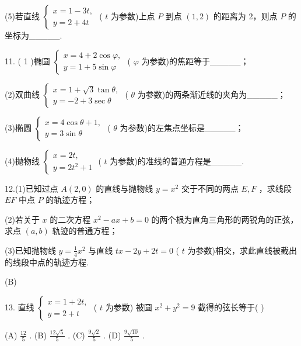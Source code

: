 \documentclass[10pt]{article}
\begin{document}
(5)若直线 \(\left\{  \begin{array}{l} x = 1 - {3t}, \\  y = 2 + {4t} \end{array}\right.\) ( \(t\) 为参数)上点 \(P\) 到点 \(\left( {1,2}\right)\) 的距离为 2，则点 \(P\) 的坐标为\_\_\_\_\_.

11. ( 1 )椭圆 \(\left\{  \begin{array}{l} x = 4 + 2\cos \varphi , \\  y = 1 + 5\sin \varphi  \end{array}\right.\) ( \(\varphi\) 为参数)的焦距等于\_\_\_\_\_；

(2)双曲线 \(\left\{  \begin{array}{l} x = 1 + \sqrt{3}\tan \theta , \\  y =  - 2 + 3\sec \theta  \end{array}\right.\) ( \(\theta\) 为参数)的两条渐近线的夹角为\_\_\_\_\_；

(3)椭圆 \(\left\{  \begin{array}{l} x = 4\cos \theta  + 1, \\  y = 3\sin \theta  \end{array}\right.\) ( \(\theta\) 为参数)的左焦点坐标是\_\_\_\_\_；

(4)抛物线 \(\left\{  \begin{array}{l} x = {2t}, \\  y = 2{t}^{2} + 1 \end{array}\right.\) ( \(t\) 为参数)的准线的普通方程是\_\_\_\_\_.

12.(1)已知过点 \(A\left( {2,0}\right)\) 的直线与抛物线 \(y = {x}^{2}\) 交于不同的两点 \(E,F\) ，求线段 \({EF}\) 中点 \(P\) 的轨迹方程；

(2)若关于 \(x\) 的二次方程 \({x}^{2} - {ax} + b = 0\) 的两个根为直角三角形的两锐角的正弦，求点 \(\left( {a,b}\right)\) 轨迹的普通方程；

(3)已知抛物线 \(y = \frac{1}{4}{x}^{2}\) 与直线 \({tx} - {2y} + {2t} = 0\) ( \(t\) 为参数)相交，求此直线被截出的线段中点的轨迹方程.

(B)

13. 直线 \(\left\{  \begin{array}{l} x = 1 + {2t}, \\  y = 2 + t \end{array}\right.\) ( \(t\) 为参数) 被圆 \({x}^{2} + {y}^{2} = 9\) 截得的弦长等于( )

(A) \(\frac{12}{5}\) . (B) \(\frac{{12}\sqrt{5}}{5}\) . (C) \(\frac{9\sqrt{2}}{5}\) . (D) \(\frac{9\sqrt{10}}{5}\) .
\end{document}
